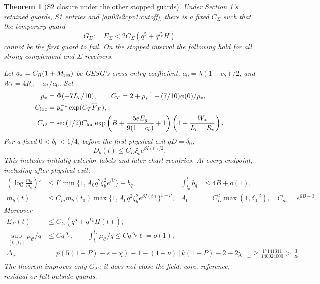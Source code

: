 \documentclass[11pt]{article}
\newtheorem{theorem}{Theorem}[section]
\theoremstyle{remark}\newtheorem{remark}[theorem]{Remark}
\begin{document}
\begin{theorem}[S2 closure under the other stopped guards]
\label{an03s2cpv1:S2}
Under Section 1's retained guards, S1 entries and
\eqref{an03s2cpv1:cutoff}, there is a fixed $C_\Sigma$ such that
the temporary guard
\begin{equation}
 G_\Sigma:\quad E_\Sigma<2C_\Sigma(q^5+q^{\Gamma_\nu}H)
 \label{an03s2cpv1:jointguard}
\end{equation}
cannot be the first guard to fail. On the stopped interval the
following hold for all strong-complement and $\Sigma$ receivers.

Let $a_*=C_R(1+M_{\rm res})$ be GESG's cross-entry coefficient,
$a_0=\lambda(1-c_b)/2$, and $W_*=4R_c+a_*/a_0$. Set
\begin{align}
 p_*&=\Phi(-7L_c/10),\qquad
 C_T=2+p_*^{-1}+(7/10)\phi(0)/p_*,\nonumber\\
 C_{\rm loc}&=p_*^{-1}\exp(C_T\overline F_F),\nonumber\\
 C_D&=\sec(1/2)C_{\rm loc}
 \exp\left(B+\frac{5eE_g}{9(1-c_b)}+1\right)
 \left(1+\frac{W_*}{L_c-R_c}\right).
 \label{an03s2cpv1:CD}
\end{align}
For a fixed $0<\delta_0<1/4$, before the first physical exit
$qD=\delta_0$,
\begin{equation}
 D_b(t)\le C_D\xi_b e^{\beta I(t)/2}.
 \label{an03s2cpv1:distance}
\end{equation}
This includes initially exterior labels and later chart reentries.
At every endpoint, including after physical exit,
\begin{align}
 \left(\log\frac{m_b}{m_c}\right)'
 &\le I'\min\{1,A_0q^2\xi_b^2e^{\beta I}\}+b_q,
 &\int_{t_0}^t b_q&\le4B+o(1),\nonumber\\
 m_b(t)&\le C_m m_b(t_0)
       \max\{1,A_0q^2\xi_b^2e^{\beta I(t)}\}^{1+\nu},
 &A_0&=C_D^2\max(1,\delta_0^{-2}),\quad C_m=e^{6B+3}.
 \label{an03s2cpv1:gain}
\end{align}
Moreover
\begin{align}
 E_\Sigma(t)&\le C_\Sigma(q^5+q^{\Gamma_\nu}H(t)),
 \label{an03s2cpv1:energy}\\
 \sup_{[t_0,t_*]}\mu_{\mathcal C}/q&\le Cq^{\Delta_\nu},
 \qquad \int_{t_0}^{t_*}\mu_{\mathcal C}/q\le Cq^{\Delta_\nu}\ell=o(1),
 \label{an03s2cpv1:compmass}\\
 \Delta_\nu&=p(5(1-P)-s-\chi)-1
 -(1+\nu)[k(1-P)-2-2\chi]_+
 \ge\frac{17141311}{140024000}>\frac3{25}.
 \label{an03s2cpv1:Delta}
\end{align}
The theorem improves only $G_\Sigma$; it does not close the
field, core, reference, residual or full outside guards.
\end{theorem}
\end{document}
